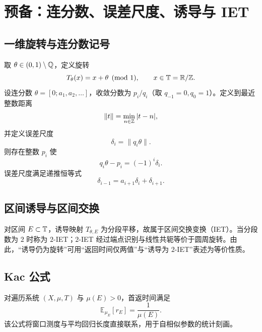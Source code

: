 \section{预备：连分数、误差尺度、诱导与 IET}

\subsection{一维旋转与连分数记号}

取 $\theta\in(0,1)\setminus\mathbb{Q}$，定义旋转
\[
T_\theta(x)=x+\theta \pmod 1,\qquad x\in\mathbb{T}=\mathbb{R}/\mathbb{Z}.
\]
设连分数 $\theta=[0;a_1,a_2,\dots]$，收敛分数为 $p_i/q_i$（取 $q_{-1}=0,q_0=1$）。定义到最近整数距离
\[
\lVert t\rVert=\min_{n\in\mathbb{Z}}|t-n|,
\]
并定义误差尺度
\[
\delta_i=\lVert q_i\theta\rVert.
\]
则存在整数 $p_i$ 使
\[
q_i\theta-p_i=(-1)^i\delta_i.
\]
误差尺度满足递推恒等式
\[
\delta_{i-1}=a_{i+1}\delta_i+\delta_{i+1}.
\]

\subsection{区间诱导与区间交换}

对区间 $E\subset\mathbb{T}$，诱导映射 $T_{\theta,E}$ 为分段平移，故属于区间交换变换（IET）。当分段数为 $2$ 时称为 $2$-IET；$2$-IET 经过端点识别与线性共轭等价于圆周旋转。由此，“诱导仍为旋转”可用“返回时间仅两值”与“诱导为 $2$-IET”表述为等价性质。

\subsection{Kac 公式}

对遍历系统 $(X,\mu,T)$ 与 $\mu(E)>0$，首返时间满足
\[
\mathbb{E}_{\mu_E}[r_E]=\frac{1}{\mu(E)}.
\]
该公式将窗口测度与平均回归长度直接联系，用于自相似参数的统计刻画。

